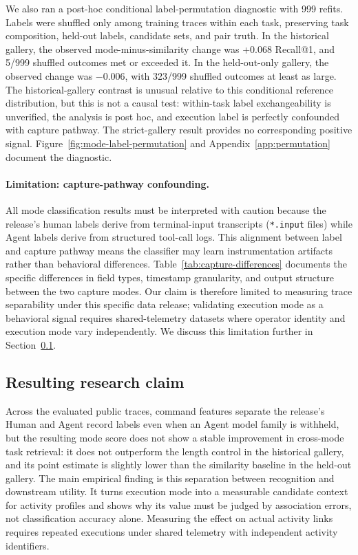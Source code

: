 We also ran a post-hoc conditional label-permutation diagnostic with 999 refits. Labels were shuffled only among training traces within each task, preserving task composition, held-out labels, candidate sets, and pair truth. In the historical gallery, the observed mode-minus-similarity change was +0.068 Recall@1, and 5/999 shuffled outcomes met or exceeded it. In the held-out-only gallery, the observed change was −0.006, with 323/999 shuffled outcomes at least as large. The historical-gallery contrast is unusual relative to this conditional reference distribution, but this is not a causal test: within-task label exchangeability is unverified, the analysis is post hoc, and execution label is perfectly confounded with capture pathway. The strict-gallery result provides no corresponding positive signal. Figure~\ref{fig:mode-label-permutation} and Appendix~\ref{app:permutation} document the diagnostic.

\paragraph{Limitation: capture-pathway confounding.} All mode classification results must be interpreted with caution because the release's human labels derive from terminal-input transcripts (\texttt{*.input} files) while Agent labels derive from structured tool-call logs. This alignment between label and capture pathway means the classifier may learn instrumentation artifacts rather than behavioral differences. Table~\ref{tab:capture-differences} documents the specific differences in field types, timestamp granularity, and output structure between the two capture modes. Our claim is therefore limited to measuring trace separability under this specific data release; validating execution mode as a behavioral signal requires shared-telemetry datasets where operator identity and execution mode vary independently. We discuss this limitation further in Section~\ref{sec:resulting-claim}.

\subsection{Resulting research claim}
\label{sec:resulting-claim}

Across the evaluated public traces, command features separate the release's Human and Agent record labels even when an Agent model family is withheld, but the resulting mode score does not show a stable improvement in cross-mode task retrieval: it does not outperform the length control in the historical gallery, and its point estimate is slightly lower than the similarity baseline in the held-out gallery. The main empirical finding is this separation between recognition and downstream utility. It turns execution mode into a measurable candidate context for activity profiles and shows why its value must be judged by association errors, not classification accuracy alone. Measuring the effect on actual activity links requires repeated executions under shared telemetry with independent activity identifiers.

